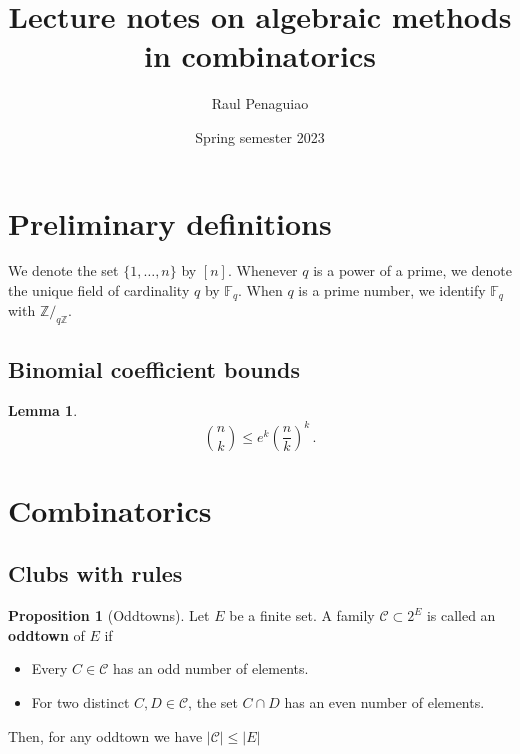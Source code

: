 \documentclass[12pt]{amsart}
\theoremstyle{definition}
\newtheorem{prop}[thm]{Proposition}
\newtheorem{lm}[thm]{Lemma}
\newcommand{\Z}{\mathbb{Z}}
\newcommand{\F}{\mathbb{F}}
\newcommand{\CC}{\mathcal C}
\begin{document}
\title{Lecture notes on algebraic methods in combinatorics} %

\author{Raul Penaguiao}
\address{Max Planck Institute for the Sciences Leipzig}
\subjclass[2010]{}
\date{Spring semester 2023} %


\maketitle

\tableofcontents

\section{Preliminary definitions}

We denote the set $\{1, \dots, n\}$ by $[n]$.
Whenever $q$ is a power of a prime, we denote the unique field of cardinality $q$ by $\F_q$.
When $q$ is a prime number, we identify $\F_q$ with $\Z/_{q\Z}$.

\subsection{Binomial coefficient bounds}


\begin{lm}\label{lm:binom_bound}
$$\binom{n}{k} \leq e^k \left( \frac{n}{k} \right)^k \, . $$
\end{lm}

\section{Combinatorics}

\subsection{Clubs with rules}


\begin{prop}[Oddtowns]\label{prop:oddtown}
Let $E$ be a finite set.
A family $\CC \subset 2^E $ is called an \textbf{oddtown} of $E$ if
\begin{itemize}
\item Every $C \in \CC $ has an odd number of elements.

\item For two distinct $C, D \in \CC$, the set $C\cap D$ has an even number of elements.
\end{itemize}

Then, for any oddtown we have $|\CC| \leq |E|$
\end{prop}
\end{document}

